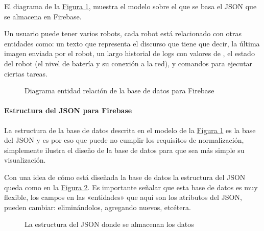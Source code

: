 El diagrama de la \hyperref[\detokenize{chapter_two/desc_cloudnao:entity-relationship-model-cn-firebase}]{Figura \ref{\detokenize{chapter_two/desc_cloudnao:entity-relationship-model-cn-firebase}}}, muestra el
modelo sobre el que se basa el JSON que se almacena en Firebase.

Un usuario puede tener varios robots, cada robot está relacionado
con otras entidades como: un texto que representa el discurso que tiene que decir,
la última imagen enviada por el robot, un largo historial de
logs con valores de , el estado del robot (el nivel de batería y
su conexión a la red), y comandos para ejecutar ciertas tareas.

\begin{figure}[htbp]
\centering
\capstart

\noindent{}
\caption{Diagrama entidad relación de la base de datos para Firebase}\label{\detokenize{chapter_two/desc_cloudnao:entity-relationship-model-cn-firebase}}\end{figure}


\paragraph{Estructura del JSON para Firebase}
\label{\detokenize{chapter_two/desc_cloudnao:estructura-del-json-para-firebase}}
La estructura de la base de datos descrita en el modelo de la \hyperref[\detokenize{chapter_two/desc_cloudnao:entity-relationship-model-cn-firebase}]{Figura \ref{\detokenize{chapter_two/desc_cloudnao:entity-relationship-model-cn-firebase}}}
es la base del JSON y es por eso que puede no cumplir los requisitos de normalización,
simplemente ilustra el diseño de la base de datos para que sea más simple su
visualización.

Con una idea de cómo está diseñada la base de datos la estructura del JSON
queda como en la \hyperref[\detokenize{chapter_two/desc_cloudnao:json-structure}]{Figura \ref{\detokenize{chapter_two/desc_cloudnao:json-structure}}}. Es importante señalar que esta base de datos
es muy flexible, los campos en las «entidades» que aquí son los atributos
del JSON, pueden cambiar: eliminándolos, agregando nuevos, etcétera.

\begin{figure}[htbp]
\centering
\capstart

\noindent{}
\caption{La estructura del JSON donde se almacenan los datos}\label{\detokenize{chapter_two/desc_cloudnao:json-structure}}\end{figure}

